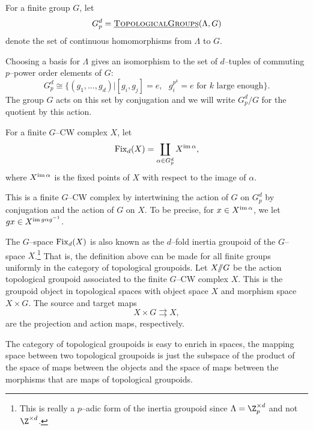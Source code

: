 
\begin{definition}
For a finite group $G$, let
\[
G_{p}^{d} = \operatorname{\underline{\smash{\normalfont\textsc{TopologicalGroups}}}}(\Lambda,G)
\]
denote the set of continuous homomorphisms from $\Lambda$ to $G$.
\end{definition}

Choosing a basis for $\Lambda$ gives an isomorphism to the set of $d$--tuples of commuting $p$--power order elements of $G$:
\[
G_{p}^{d} \cong \{(g_1,\ldots, g_d)|[g_i,g_j] = e, \text{ } g_{i}^{p^k}=e \text{ for } k \text{ large enough}\}.
\]
The group $G$ acts on this set by conjugation and we will write $G_{p}^{d}/G$ for the quotient by this action.

\begin{definition} \label{fix}
For a finite $G$--CW complex $X$, let
\[
\operatorname{Fix}_d(X) = \coprod_{\alpha \in G_{p}^{d}} X^{\operatorname{im} \alpha},
\]
where $X^{\operatorname{im} \alpha}$ is the fixed points of $X$ with respect to the image of $\alpha$.
\end{definition}

This is a finite $G$--CW complex by intertwining the action of $G$ on $G_{p}^{d}$ by conjugation and the action of $G$ on $X$. To be precise, for $x \in X^{\operatorname{im} \alpha}$, we let $gx \in X^{\operatorname{im} g \alpha g^{-1}}$.

The $G$--space $\operatorname{Fix}_d(X)$ is also known as the $d$--fold inertia groupoid of the $G$--space $X$.\footnote{This is really a $p$--adic form of the inertia groupoid since $\Lambda = \Z_{p}^{\times d}$ and not $\Z^{\times d}$.} That is, the definition above can be made for all finite groups uniformly in the category of topological groupoids. Let $X /\!\!/ G$ be the action topological groupoid associated to the finite $G$--CW complex $X$. This is the groupoid object in topological spaces with object space $X$ and morphism space $X \times G$. The source and target maps
\[
X \times G \rightrightarrows X,
\]
are the projection and action maps, respectively.


The category of topological groupoids is easy to enrich in spaces, the mapping space between two topological groupoids is just the subspace of the product of the space of maps between the objects and the space of maps between the morphisms that are maps of topological groupoids. 

